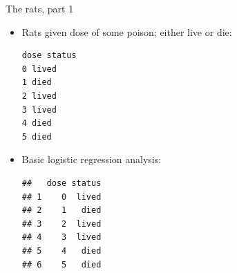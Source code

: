 \begin{frame}[fragile]{The rats, part 1}

  \begin{itemize}
  \item Rats given dose of some poison; either live or die:

{\scriptsize
\begin{verbatim}
dose status
0 lived
1 died
2 lived
3 lived
4 died
5 died
\end{verbatim}
}
\item Basic logistic regression analysis:

{\footnotesize
 
\begin{knitrout}
\color{fgcolor}\begin{kframe}
\begin{alltt}
\hlkwb{=}\hlstd{(}\hlstd{,}
\end{alltt}
\begin{verbatim}
##   dose status
## 1    0  lived
## 2    1   died
## 3    2  lived
## 4    3  lived
## 5    4   died
## 6    5   died
\end{verbatim}
\begin{alltt}
\hlkwb{=}\hlopt{~}\hlstd{=}\hlstd{)}
\end{alltt}
\end{kframe}
\end{knitrout}
}
  

  \end{itemize}
  



\end{frame}
  

